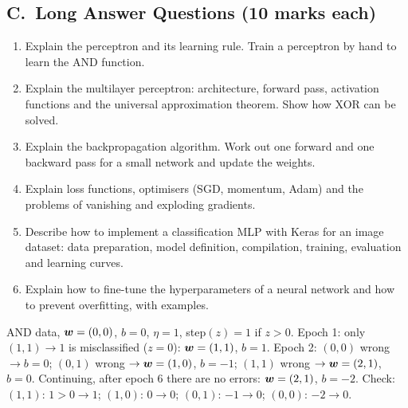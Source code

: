 \subsection*{C.\ Long Answer Questions (10 marks each)}
\begin{enumerate}
  \item Explain the perceptron and its learning rule. Train a perceptron by hand to learn the AND function. 
  \item Explain the multilayer perceptron: architecture, forward pass, activation functions and the universal approximation theorem. Show how XOR can be solved. 
  \item Explain the backpropagation algorithm. Work out one forward and one backward pass for a small network and update the weights. 
  \item Explain loss functions, optimisers (SGD, momentum, Adam) and the problems of vanishing and exploding gradients. 
  \item Describe how to implement a classification MLP with Keras for an image dataset: data preparation, model definition, compilation, training, evaluation and learning curves. 
  \item Explain how to fine-tune the hyperparameters of a neural network and how to prevent overfitting, with examples. 
\end{enumerate}

\begin{modelans}
AND data, $\boldsymbol{w}=(0,0)$, $b=0$, $\eta=1$, step$(z)=1$ if $z>0$. Epoch 1: only $(1,1)\to1$ is misclassified ($z=0$): $\boldsymbol{w}=(1,1)$, $b=1$. Epoch 2: $(0,0)$ wrong $\to b=0$; $(0,1)$ wrong $\to\boldsymbol{w}=(1,0)$, $b=-1$; $(1,1)$ wrong $\to\boldsymbol{w}=(2,1)$, $b=0$. Continuing, after epoch 6 there are no errors: $\boldsymbol{w}=(2,1)$, $b=-2$. Check: $(1,1)$: $1>0\to1$; $(1,0)$: $0\to0$; $(0,1)$: $-1\to0$; $(0,0)$: $-2\to0$.
\end{modelans}

